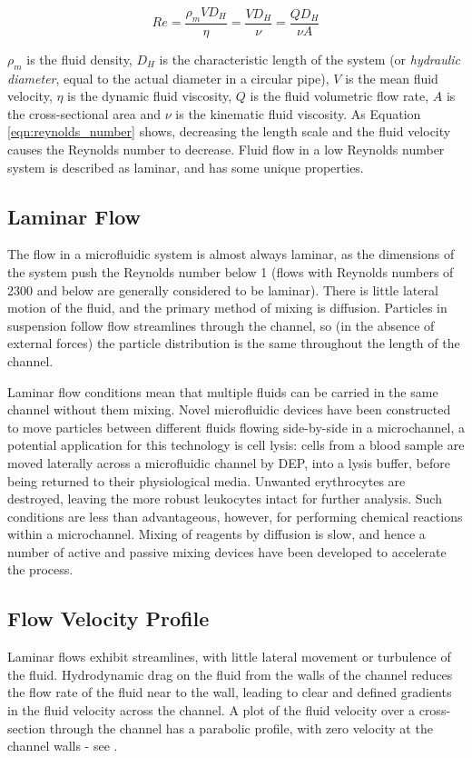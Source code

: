 \begin{equation}
 Re = \frac{\rho_{m} V D_{H}}{\eta} = \frac{V D_{H}}{\nu} = \frac{Q D_{H}}{\nu A}
\label{eqn:reynolds_number}
\end{equation}


$\rho_{m}$ is the fluid density, $D_{H}$ is the characteristic length of the system (or \textit{hydraulic diameter}, equal to the actual diameter in a circular pipe), $V$ is the mean fluid velocity, $\eta$ is the dynamic fluid viscosity, $Q$ is the fluid volumetric flow rate, $A$ is the cross-sectional area and $\nu$ is the kinematic fluid viscosity. As Equation \ref{eqn:reynolds_number} shows, decreasing the length scale and the fluid velocity causes the Reynolds number to decrease. Fluid flow in a low Reynolds number system is described as laminar, and has some unique properties.

\subsection{Laminar Flow}

The flow in a microfluidic system is almost always laminar, as the dimensions of the system push the Reynolds number below 1 (flows with Reynolds numbers of 2300 and below are generally considered to be laminar). There is little lateral motion of the fluid, and the primary method of mixing is diffusion. Particles in suspension follow flow streamlines through the channel, so (in the absence of external forces) the particle distribution is the same throughout the length of the channel. 

Laminar flow conditions mean that multiple fluids can be carried in the same channel without them mixing. Novel microfluidic devices have been constructed to move particles between different fluids flowing side-by-side in a microchannel, a potential application for this technology is cell lysis: cells from a blood sample are moved laterally across a microfluidic channel by DEP, into a lysis buffer, before being returned to their physiological media. Unwanted erythrocytes are destroyed, leaving the more robust leukocytes intact for further analysis. Such conditions are less than advantageous, however, for performing chemical reactions within a microchannel. Mixing of reagents by diffusion is slow, and hence a number of active and passive mixing devices have been developed to accelerate the process.

\subsection{Flow Velocity Profile}
\label{sec:flow_velocity_profile}
Laminar flows exhibit streamlines, with little lateral movement or turbulence of the fluid. Hydrodynamic drag on the fluid from the walls of the channel reduces the flow rate of the fluid near to the wall, leading to clear and defined gradients in the fluid velocity across the channel. A plot of the fluid velocity over a cross-section through the channel has a parabolic profile, with zero velocity at the channel walls - see .

